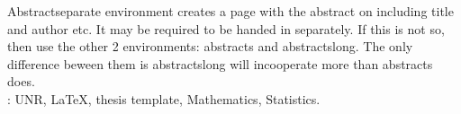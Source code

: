 %
\begin{abstracts}			%

Abstractseparate environment creates a page with the abstract on including title and author 
etc.  It may be required to be handed in separately. If this is not so, then use the other 
2 environments: abstracts and abstractslong. The only difference beween them is 
abstractslong will incooperate more than abstracts does. \\

: UNR, \LaTeX, thesis template, Mathematics, Statistics. \\

\end{abstracts}


